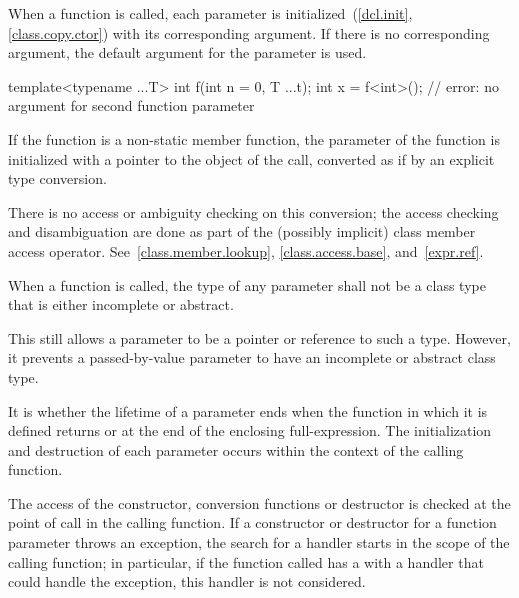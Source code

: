 \pnum
{}%
%
%
When a function is called, each parameter is
initialized~(\ref{dcl.init}, \ref{class.copy.ctor}) with
its corresponding argument.
If there is no corresponding argument,
the default argument for the parameter is used.
\begin{example}
\begin{codeblock}
template<typename ...T> int f(int n = 0, T ...t);
int x = f<int>();               // error: no argument for second function parameter
\end{codeblock}
\end{example}
If the function is a non-static member
function, the  parameter of the function
is initialized with a pointer to the object of the call, converted
as if by an explicit type conversion.
\begin{note}
There is no access or ambiguity checking on this conversion; the access
checking and disambiguation are done as part of the (possibly implicit)
class member access operator.
See~\ref{class.member.lookup}, \ref{class.access.base},
and~\ref{expr.ref}.
\end{note}
When a function is called, the type of any parameter
shall not be a class type that is either incomplete or abstract.
\begin{note}
This still allows a parameter to be a pointer or reference to such
a type. However, it prevents a passed-by-value parameter
to have an incomplete or abstract class type.
\end{note}
It is  whether the
lifetime of a parameter ends when the function in which it is defined
returns or at the end of the enclosing full-expression.
The initialization and destruction of each parameter occurs
within the context of the calling function.
\begin{example}
The access of the constructor, conversion functions or destructor is
checked at the point of call in the calling function. If a constructor
or destructor for a function parameter throws an exception, the search
for a handler starts in the scope of the calling function; in
particular, if the function called has a 
with a handler that could handle the exception,
this handler is not considered.
\end{example}

